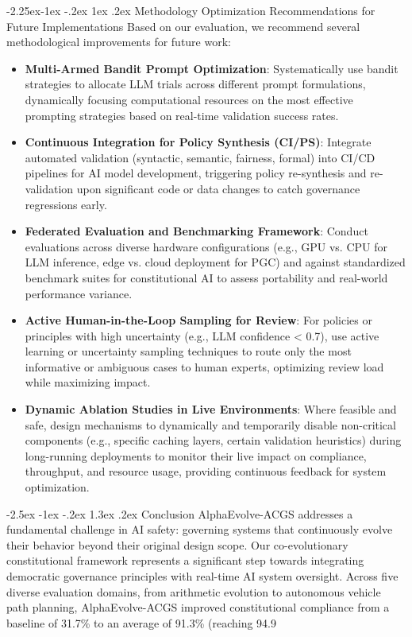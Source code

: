 \documentclass[manuscript,screen,review,anonymous,9pt]{acmart}
\makeatletter
\renewcommand\section{\@startsection{section}{1}{\z@}%
  {-2.5ex \@plus -1ex \@minus -.2ex}%
  {1.3ex \@plus.2ex}%
  {\normalfont\Large\bfseries}}
\renewcommand\subsection{\@startsection{subsection}{2}{\z@}%
  {-2.25ex\@plus -1ex \@minus -.2ex}%
  {1ex \@plus .2ex}%
  {\normalfont\large\bfseries}}
\makeatother
\begin{document}
\subsection{Methodology Optimization Recommendations for Future Implementations}
\label{subsec:methodology_optimization}
Based on our evaluation, we recommend several methodological improvements for future work:
\begin{itemize}[leftmargin=*,itemsep=1pt,parsep=1pt]
    \item \textbf{Multi-Armed Bandit Prompt Optimization}: Systematically use bandit strategies to allocate LLM trials across different prompt formulations, dynamically focusing computational resources on the most effective prompting strategies based on real-time validation success rates.
    \item \textbf{Continuous Integration for Policy Synthesis (CI/PS)}: Integrate automated validation (syntactic, semantic, fairness, formal) into CI/CD pipelines for AI model development, triggering policy re-synthesis and re-validation upon significant code or data changes to catch governance regressions early.
    \item \textbf{Federated Evaluation and Benchmarking Framework}: Conduct evaluations across diverse hardware configurations (e.g., GPU vs. CPU for LLM inference, edge vs. cloud deployment for PGC) and against standardized benchmark suites for constitutional AI to assess portability and real-world performance variance.
    \item \textbf{Active Human-in-the-Loop Sampling for Review}: For policies or principles with high uncertainty (e.g., LLM confidence < 0.7), use active learning or uncertainty sampling techniques to route only the most informative or ambiguous cases to human experts, optimizing review load while maximizing impact.
    \item \textbf{Dynamic Ablation Studies in Live Environments}: Where feasible and safe, design mechanisms to dynamically and temporarily disable non-critical components (e.g., specific caching layers, certain validation heuristics) during long-running deployments to monitor their live impact on compliance, throughput, and resource usage, providing continuous feedback for system optimization.
\end{itemize}

\section{Conclusion}
\label{sec:conclusion}
AlphaEvolve-ACGS addresses a fundamental challenge in AI safety: governing systems that continuously evolve their behavior beyond their original design scope. Our co-evolutionary constitutional framework represents a significant step towards integrating democratic governance principles with real-time AI system oversight. Across five diverse evaluation domains, from arithmetic evolution to autonomous vehicle path planning, AlphaEvolve-ACGS improved constitutional compliance from a baseline of 31.7\% to an average of 91.3\% (reaching 94.9%
\end{document}
